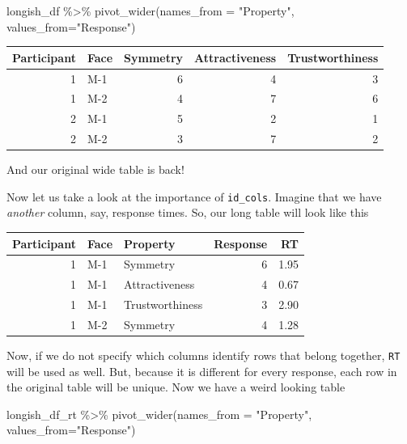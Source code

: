 \documentclass[
]{book}
\newenvironment{Shaded}{\begin{snugshade}}{\end{snugshade}}
\newcommand{\AttributeTok}[1]{\textcolor[rgb]{0.77,0.63,0.00}{#1}}
\newcommand{\FunctionTok}[1]{\textcolor[rgb]{0.00,0.00,0.00}{#1}}
\newcommand{\NormalTok}[1]{#1}
\newcommand{\SpecialCharTok}[1]{\textcolor[rgb]{0.00,0.00,0.00}{#1}}
\newcommand{\StringTok}[1]{\textcolor[rgb]{0.31,0.60,0.02}{#1}}
\begin{document}
\begin{Shaded}
\begin{Highlighting}[]
\NormalTok{longish\_df }\SpecialCharTok{\%\textgreater{}\%}
  \FunctionTok{pivot\_wider}\NormalTok{(}\AttributeTok{names\_from =} \StringTok{"Property"}\NormalTok{, }\AttributeTok{values\_from=}\StringTok{"Response"}\NormalTok{)}
\end{Highlighting}
\end{Shaded}

\begin{tabular}{r|l|r|r|r}
\hline
Participant & Face & Symmetry & Attractiveness & Trustworthiness\\
\hline
1 & M-1 & 6 & 4 & 3\\
\hline
1 & M-2 & 4 & 7 & 6\\
\hline
2 & M-1 & 5 & 2 & 1\\
\hline
2 & M-2 & 3 & 7 & 2\\
\hline
\end{tabular}

And our original wide table is back!

Now let us take a look at the importance of \texttt{id\_cols}. Imagine that we have \emph{another} column, say, response times. So, our long table will look like this

\begin{tabular}{r|l|l|r|r}
\hline
Participant & Face & Property & Response & RT\\
\hline
1 & M-1 & Symmetry & 6 & 1.95\\
\hline
1 & M-1 & Attractiveness & 4 & 0.67\\
\hline
1 & M-1 & Trustworthiness & 3 & 2.90\\
\hline
1 & M-2 & Symmetry & 4 & 1.28\\
\hline
\end{tabular}

Now, if we do not specify which columns identify rows that belong together, \texttt{RT} will be used as well. But, because it is different for every response, each row in the original table will be unique. Now we have a weird looking table

\begin{Shaded}
\begin{Highlighting}[]
\NormalTok{longish\_df\_rt }\SpecialCharTok{\%\textgreater{}\%}
  \FunctionTok{pivot\_wider}\NormalTok{(}\AttributeTok{names\_from =} \StringTok{"Property"}\NormalTok{, }\AttributeTok{values\_from=}\StringTok{"Response"}\NormalTok{)}
\end{Highlighting}
\end{Shaded}
\end{document}

